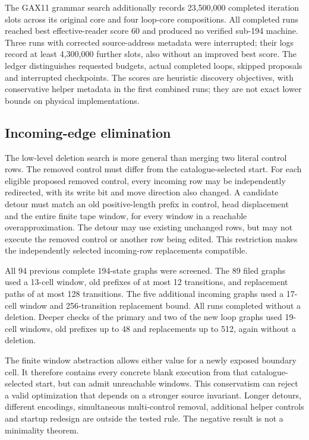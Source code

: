 \documentclass[11pt,a4paper]{article}
\begin{document}
The GAX11 grammar search additionally records 23,500,000 completed
iteration slots across its original core and four loop-core compositions.
All completed runs reached best effective-reader score 60 and produced
no verified sub-194 machine. Three runs with corrected source-address
metadata were interrupted; their logs record at least 4,300,000 further
slots, also without an improved best score. The ledger distinguishes
requested budgets, actual completed loops, skipped proposals and
interrupted checkpoints. The scores are heuristic discovery objectives,
with conservative helper metadata in the first combined runs; they are
not exact lower bounds on physical implementations.

\subsection{Incoming-edge elimination}

The low-level deletion search is more general than merging two literal
control rows. The removed control must differ from the catalogue-selected
start. For each eligible proposed removed control, every incoming row may
be independently redirected, with its write bit and move direction also
changed. A candidate detour must match an old positive-length prefix in
control, head displacement and the entire finite tape window, for every
window in a reachable overapproximation. The detour may use existing
unchanged rows, but may not execute the removed control or another row
being edited. This restriction makes the independently selected
incoming-row replacements compatible.

All 94 previous complete 194-state graphs were screened. The 89 filed
graphs used a 13-cell window, old prefixes of at most 12 transitions,
and replacement paths of at most 128 transitions. The five additional
incoming graphs used a 17-cell window and 256-transition replacement
bound. All runs completed without a deletion. Deeper checks of the
primary and two of the new loop graphs used 19-cell windows, old prefixes
up to 48 and replacements up to 512, again without a deletion.

The finite window abstraction allows either value for a newly exposed
boundary cell. It therefore contains every concrete blank execution from
that catalogue-selected start, but
can admit unreachable windows. This conservatism can reject a valid
optimization that depends on a stronger source invariant. Longer
detours, different encodings, simultaneous multi-control removal,
additional helper controls and startup redesign are outside the tested
rule. The negative result is not a minimality theorem.
\end{document}
